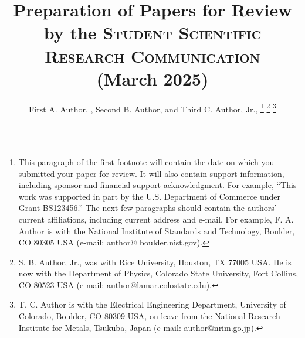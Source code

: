 \documentclass{IEEEtran}
\begin{document}
\title{Preparation of Papers for Review by the \textsc{Student Scientific Research Communication} \\ (March 2025)}
\author{First A. Author, , Second B. Author, and Third C. Author, Jr., 
\thanks{This paragraph of the first footnote will contain the
date on which you submitted your paper for review. It will also contain
support information, including sponsor and financial support acknowledgment.
For example, ``This work was supported in part by the U.S. Department of
Commerce under Grant BS123456.'' The next few paragraphs should contain the
authors' current affiliations, including current address and e-mail. For
example, F. A. Author is with the National Institute of Standards and
Technology, Boulder, CO 80305 USA (e-mail: author@ boulder.nist.gov).}
\thanks{S. B. Author, Jr., was with Rice University, Houston, TX 77005 USA. He is
now with the Department of Physics, Colorado State University, Fort Collins,
CO 80523 USA (e-mail: author@lamar.colostate.edu).}
\thanks{T. C. Author is with
the Electrical Engineering Department, University of Colorado, Boulder, CO
80309 USA, on leave from the National Research Institute for Metals,
Tsukuba, Japan (e-mail: author@nrim.go.jp).}}

\maketitle
\end{document}
